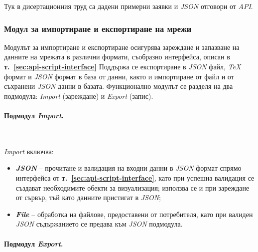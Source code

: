 Тук в дисертационния труд са дадени примерни заявки и \textit{JSON} отговори от \textit{API}.

\subsubsection{Модул за импортиране и експортиране на мрежи}
\hspace*{2.5em}Модулът за импортиране и експортиране осигурява зареждане и запазване на данните на мрежата в различни формати, съобразно интерфейса, описан в \textbf{т.~\ref{sec:api-script-interface}} Поддържа се експортиране в \textit{JSON} файл, \textit{TeX} формат и \textit{JSON} формат в база от данни, както и импортиране от файл и от съхранени \textit{JSON} данни в базата. Функционално модулът се разделя на два подмодула: \textit{Import} (зареждане) и \textit{Export} (запис).

\paragraph{Подмодул \textit{Import}.}
\mbox{}\\

\vspace{-0.35cm}

\textit{Import} включва:
\vspace{-0.15cm}
\begin{itemize}
    \item \textbf{\textit{JSON}} -- прочитане и валидация на входни данни в \textit{JSON} формат спрямо интерфейса от \textbf{т.~\ref{sec:api-script-interface}}, като при успешна валидация се създават необходимите обекти за визуализация; използва се и при зареждане от сървър, тъй като данните пристигат в \textit{JSON};
    \item \textbf{\textit{File}} -- обработка на файлове, предоставени от потребителя, като при валиден \textit{JSON} съдържанието се предава към \textit{JSON} подмодула.
\end{itemize}

\paragraph{Подмодул \textit{Export}.}
\mbox{}\\

\vspace{-0.35cm}

